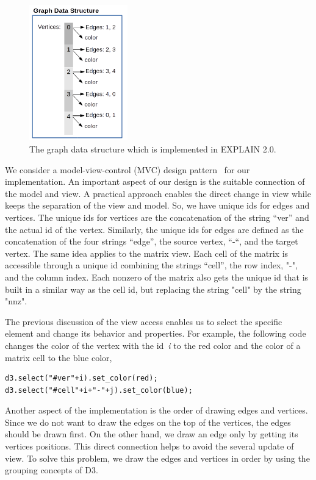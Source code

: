 \documentclass[12pt, twoside,a4paper,toc=bibliography]{scrbook}
\begin{document}
\begin{figure}
\centering
\includegraphics[width=0.38\textwidth]{graph}
\caption{The graph data structure which is implemented in EXPLAIN 2.0.}
\label{f.graph-ds}
\end{figure}
We consider a model-view-control (MVC) design pattern~\cite{osmani2012learning} for our implementation.
An important aspect of our design is the suitable connection of the
model and view. A practical approach enables the direct change in view while keeps the
separation of the view and model. 
So, we have unique ids for
edges and vertices. The unique ids for vertices are the concatenation of the
string “ver” and the actual id of the vertex. Similarly, the unique ids for edges are
defined as the concatenation of the four strings “edge”, the source vertex, “-“,
and the target vertex. The same idea applies to the matrix view. Each cell of the matrix
is accessible through a unique id combining the strings “cell”, the row index,
"-", and the column index. 
Each nonzero of the matrix also gets the unique id that is built in a similar way
as the cell id, but replacing the string "cell" by the string "nnz".

The previous discussion of the view access enables us to select the
specific element and change its behavior and properties. For example, the following
code changes the color of the vertex with the id~\textit{i} to the red color 
and the color of a matrix cell to the blue color,
\begin{lstlisting}
d3.select("#ver"+i).set_color(red);
d3.select("#cell"+i+"-"+j).set_color(blue);
\end{lstlisting}

Another aspect of the implementation is the order of drawing edges and
vertices. Since we do not want to draw the edges on the top of the vertices,
the edges should be drawn first. On the other hand, we draw an edge
only by getting its vertices positions. This direct connection helps to avoid
the several update of view.
To solve this problem, 
we draw the edges and vertices in order by using the grouping concepts of D3.
\end{document}
